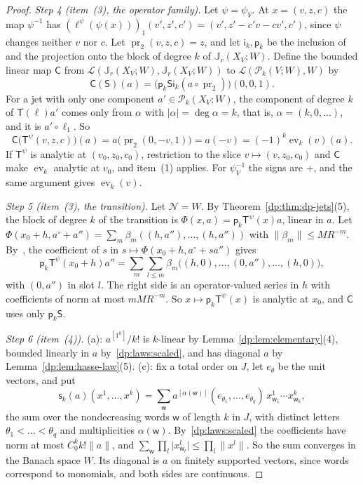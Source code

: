 \documentclass[11pt]{amsart}
\theoremstyle{definition}
\theoremstyle{remark}
\numberwithin{equation}{section}
\newcommand{\cL}{\mathcal L}
\newcommand{\abs}[1]{\lvert #1\rvert}
\newcommand{\norm}[1]{\lVert #1\rVert}
\theoremstyle{plain}
\theoremstyle{definition}
\theoremstyle{plain}
\newcommand{\ev}{\operatorname{ev}}
\newcommand{\cP}{\mathcal P}
\begin{document}
\begin{proof}
\emph{Step 4 (item~(3), the operator family).} Let $\psi=\psi_V$. At $x=(v,z,c)$ the map $\psi^{-1}$ has $(\ell^\psi(\psi(x)))_1(v',z',c')=(v',z'-c'v-cv',c')$, since $\psi$ changes neither $v$ nor $c$. Let $\operatorname{pr}_2(v,z,c)=z$, and let $\mathsf i_k,\mathsf p_k$ be the inclusion of and the projection onto the block of degree $k$ of $\mathbb J_r(X_V;W)$. Define the bounded linear map $\mathsf C$ from $\cL(\mathbb J_r(X_V;W),\mathbb J_r(X_V;W))$ to $\cL(\cP_k(V;W),W)$ by
\[
 \mathsf C(\mathsf S)(a)=\bigl(\mathsf p_k\mathsf S\mathsf i_k(a\circ\operatorname{pr}_2)\bigr)(0,0,1).
\]
For a jet with only one component $a'\in\cP_k(X_V;W)$, the component of degree $k$ of $\mathsf T(\ell)a'$ comes only from $\alpha$ with $\abs\alpha=\deg\alpha=k$, that is, $\alpha=(k,0,\dots)$, and it is $a'\circ\ell_1$. So
\begin{equation}\label{dp:13:eq:compression}
 \mathsf C\bigl(\mathsf T^\psi(v,z,c)\bigr)(a)=a\bigl(\operatorname{pr}_2(0,-v,1)\bigr)=a(-v)=(-1)^k\ev_k(v)(a).
\end{equation}
If $\mathsf T^\psi$ is analytic at $(v_0,z_0,c_0)$, restriction to the slice $v\mapsto(v,z_0,c_0)$ and $\mathsf C$ make $\ev_k$ analytic at $v_0$, and item~(1) applies. For $\psi_V^{-1}$ the signs are $+$, and the same argument gives $\ev_k(v)$.

\emph{Step 5 (item~(3), the transition).} Let $\mathcal N=W$. By Theorem~\ref{dp:thm:dp-jets}(5), the block of degree $k$ of the transition is $\Phi(x,a)=\mathsf p_k\mathsf T^\psi(x)a$, linear in $a$. Let $\Phi(x_0+h,a^\circ+a'')=\sum_m\beta_m((h,a''),\dots,(h,a''))$ with $\norm{\beta_m}\le MR^{-m}$. By~\cite[Lemma~A.1]{I}, the coefficient of $s$ in $s\mapsto\Phi(x_0+h,a^\circ+sa'')$ gives
\[
 \mathsf p_k\mathsf T^\psi(x_0+h)a''=\sum_m\sum_{l\le m}\beta_m\bigl((h,0),\dots,(0,a''),\dots,(h,0)\bigr),
\]
with $(0,a'')$ in slot $l$. The right side is an operator-valued series in $h$ with coefficients of norm at most $mMR^{-m}$. So $x\mapsto\mathsf p_k\mathsf T^\psi(x)$ is analytic at $x_0$, and $\mathsf C$ uses only $\mathsf p_k\mathsf S$.

\emph{Step 6 (item~(4)).} (a): $a^{[1^k]}/k!$ is $k$-linear by Lemma~\ref{dp:lem:elementary}(4), bounded linearly in $a$ by~\eqref{dp:laws:scaled}, and has diagonal $a$ by Lemma~\ref{dp:lem:hasse-law}(5). (c): fix a total order on $J$, let $e_\theta$ be the unit vectors, and put
\[
 \mathsf s_k(a)(x^1,\dots,x^k)=\sum_{\mathsf w}a^{[\alpha(\mathsf w)]}(e_{\theta_1},\dots,e_{\theta_q})\,x^1_{\mathsf w_1}\cdots x^k_{\mathsf w_k},
\]
the sum over the nondecreasing words $\mathsf w$ of length $k$ in $J$, with distinct letters $\theta_1<\dots<\theta_q$ and multiplicities $\alpha(\mathsf w)$. By~\eqref{dp:laws:scaled} the coefficients have norm at most $C_0^kk!\norm a$, and $\sum_{\mathsf w}\prod_l\abs{x^l_{\mathsf w_l}}\le\prod_l\norm{x^l}$. So the sum converges in the Banach space $W$. Its diagonal is $a$ on finitely supported vectors, since words correspond to monomials, and both sides are continuous.


\end{proof}
\end{document}
